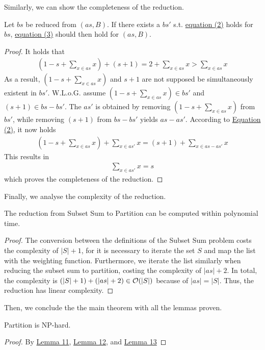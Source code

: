 Similarly, we can show the completeness of the reduction.
\begin{lemma}[Completeness]
    \label{lemma:12}
    Let $bs$ be reduced from $(as, B)$. If there exists a $bs'$ s.t. \hyperref[eq:2]{equation (2)} holds for $bs$, 
    \hyperref[eq:3]{equation (3)} should then hold for $(as, B)$.
\end{lemma}
\begin{proof}
    It holds that
\begin{align*}
    (1 - s + \sum_{x \in as} x) + (s + 1) = 2 + \sum_{x \in as} x > \sum_{x \in as} x
\end{align*}
As a result, $(1 - s + \sum_{x \in as} x)$ and $s + 1$ are not supposed be simultaneously existent in $bs'$. 
W.L.o.G. assume $(1 - s + \sum_{x \in as} x) \in bs'$ and $(s + 1) \in bs - bs'$. 
The $as'$ is obtained by removing $(1 - s + \sum_{x \in as} x)$ from $bs'$, while removing $(s + 1)$ from $bs - bs'$
yields $as - as'$. According to \hyperref[eq:2]{Equation (2)}, it now holds 
\begin{align*}
    (1 - s + \sum_{x \in as} x) + \sum_{x \in as'} x = (s + 1) + \sum_{x \in as - as'} x
\end{align*}
This results in 
\begin{align*}
    \sum_{x \in as'} x = s
\end{align*}
which proves the completeness of the reduction.
\end{proof} 
Finally, we analyse the complexity of the reduction.
\begin{lemma}
    \label{lemma:13}
    The reduction from Subset Sum to Partition can be computed within polynomial time.
\end{lemma}
\begin{proof}
The conversion between the definitions of the Subset Sum problem costs the complexity of $|S| + 1$,
for it is necessary to iterate the set $S$ and map the list with the weighting function. Furthermore, we iterate the list similarly when reducing the subset sum to partition, costing
the complexity of $|as| + 2$. In total, the complexity is $(|S| + 1) + (|as| + 2) \in \mathcal{O}({|S|})$  because of $|as| = |S|$.
Thus, the reduction has linear complexity.
\end{proof}
Then, we conclude the the main theorem with all the lemmas proven.
\begin{theorem}
    Partition is NP-hard.
\end{theorem}
\begin{proof}
    By \hyperref[lemma:11]{Lemma 11}, \hyperref[lemma:12]{Lemma 12}, and \hyperref[lemma:13]{Lemma 13}
\end{proof}
